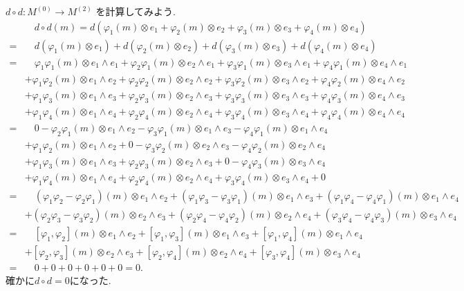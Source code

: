 \documentclass[11pt, a4paper, dvipdfmx]{jsarticle}
\theoremstyle{definition}
\newcommand{\pphi}{\varphi} %
\numberwithin{equation}{section}
\begin{document}
$d\circ d: M^{(0)}\to M^{(2)}$ を計算してみよう. 
{\small
\begin{align*}
    &\quad d\circ d(m) 
    = d\left(
        \pphi_1(m)\otimes e_1+ \pphi_2(m)\otimes e_2+ 
        \pphi_3(m)\otimes e_3+ \pphi_4(m)\otimes e_4
    \right)\\
    =&\quad d(\pphi_1(m)\otimes e_1)+ d(\pphi_2(m)\otimes e_2)
    + d(\pphi_3(m)\otimes e_3)+ d(\pphi_4(m)\otimes e_4)\\
    =& \quad
     \pphi_1\pphi_1(m)\otimes e_1\wedge e_1
    +\pphi_2\pphi_1(m)\otimes e_2\wedge e_1
    +\pphi_3\pphi_1(m)\otimes e_3\wedge e_1
    +\pphi_4\pphi_1(m)\otimes e_4\wedge e_1\\
    &+\pphi_1\pphi_2(m)\otimes e_1\wedge e_2
    +\pphi_2\pphi_2(m)\otimes e_2\wedge e_2
    +\pphi_3\pphi_2(m)\otimes e_3\wedge e_2
    +\pphi_4\pphi_2(m)\otimes e_4\wedge e_2\\
    &+\pphi_1\pphi_3(m)\otimes e_1\wedge e_3
    +\pphi_2\pphi_3(m)\otimes e_2\wedge e_3
    +\pphi_3\pphi_3(m)\otimes e_3\wedge e_3
    +\pphi_4\pphi_3(m)\otimes e_4\wedge e_3\\
    &+\pphi_1\pphi_4(m)\otimes e_1\wedge e_4
    +\pphi_2\pphi_4(m)\otimes e_2\wedge e_4
    +\pphi_3\pphi_4(m)\otimes e_3\wedge e_4
    +\pphi_4\pphi_4(m)\otimes e_4\wedge e_4
    \end{align*}
    \begin{align*}
    =& \quad 
    0 
    -\pphi_2\pphi_1(m)\otimes e_1\wedge e_2
    -\pphi_3\pphi_1(m)\otimes e_1\wedge e_3
    -\pphi_4\pphi_1(m)\otimes e_1\wedge e_4\\
    &+\pphi_1\pphi_2(m)\otimes e_1\wedge e_2
    +0
    -\pphi_3\pphi_2(m)\otimes e_2\wedge e_3
    -\pphi_4\pphi_2(m)\otimes e_2\wedge e_4\\
    &+\pphi_1\pphi_3(m)\otimes e_1\wedge e_3
    +\pphi_2\pphi_3(m)\otimes e_2\wedge e_3
    +0
    -\pphi_4\pphi_3(m)\otimes e_3\wedge e_4\\
    &+\pphi_1\pphi_4(m)\otimes e_1\wedge e_4
    +\pphi_2\pphi_4(m)\otimes e_2\wedge e_4
    +\pphi_3\pphi_4(m)\otimes e_3\wedge e_4
    +0\\
    =& \quad
    (\pphi_1\pphi_2-\pphi_2\pphi_1)(m)\otimes e_1\wedge e_2
    +(\pphi_1\pphi_3-\pphi_3\pphi_1)(m)\otimes e_1\wedge e_3
    +(\pphi_1\pphi_4-\pphi_4\pphi_1)(m)\otimes e_1\wedge e_4\\
    &+(\pphi_2\pphi_3-\pphi_3\pphi_2)(m)\otimes e_2\wedge e_3
    +(\pphi_2\pphi_4-\pphi_4\pphi_2)(m)\otimes e_2\wedge e_4
    +(\pphi_3\pphi_4-\pphi_4\pphi_3)(m)\otimes e_3\wedge e_4\\
    =& \quad 
    [\pphi_1,\pphi_2](m)\otimes e_1\wedge e_2
    +[\pphi_1,\pphi_3](m)\otimes e_1\wedge e_3
    +[\pphi_1,\pphi_4](m)\otimes e_1\wedge e_4\\
    &+[\pphi_2,\pphi_3](m)\otimes e_2\wedge e_3
    +[\pphi_2,\pphi_4](m)\otimes e_2\wedge e_4
    +[\pphi_3,\pphi_4](m)\otimes e_3\wedge e_4\\
    =& \quad 0+0+0+0+0+0 = 0.
\end{align*}}
確かに$d\circ d = 0$になった. 
\end{document}
